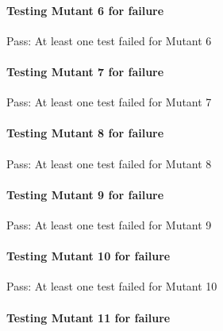 \paragraph*{Testing Mutant 6 for failure}


\begin{DoxyItemize}
\item Pass\+: At least one test failed for Mutant 6
\end{DoxyItemize}

\paragraph*{Testing Mutant 7 for failure}


\begin{DoxyItemize}
\item Pass\+: At least one test failed for Mutant 7
\end{DoxyItemize}

\paragraph*{Testing Mutant 8 for failure}


\begin{DoxyItemize}
\item Pass\+: At least one test failed for Mutant 8
\end{DoxyItemize}

\paragraph*{Testing Mutant 9 for failure}


\begin{DoxyItemize}
\item Pass\+: At least one test failed for Mutant 9
\end{DoxyItemize}

\paragraph*{Testing Mutant 10 for failure}


\begin{DoxyItemize}
\item Pass\+: At least one test failed for Mutant 10
\end{DoxyItemize}

\paragraph*{Testing Mutant 11 for failure}


